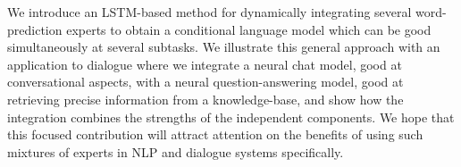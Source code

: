 We introduce an LSTM-based method for dynamically integrating several word-prediction experts to obtain a conditional language model which can be good simultaneously at several subtasks. We illustrate this general approach with an application to dialogue where we integrate a neural chat model, good at conversational aspects, with a neural question-answering model, good at retrieving precise information from a knowledge-base, and show how the integration combines the strengths of the independent components. We hope that this focused contribution will attract attention on the benefits of using such mixtures of experts in NLP and dialogue systems specifically.
